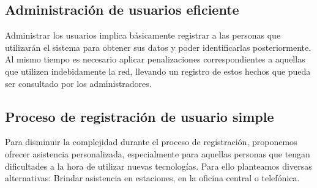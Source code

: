 \subsection{Administración de usuarios eficiente}

Administrar los usuarios implica básicamente registrar a las personas que utilizarán el sistema para obtener sus datos y 
poder identificarlas posteriormente. Al mismo tiempo es necesario aplicar penalizaciones correspondientes a aquellas que 
utilizen indebidamente la red, llevando un registro de estos hechos que pueda ser consultado por los administradores. 

\subsection{Proceso de registración de usuario simple}

Para disminuir la complejidad durante el proceso de registración, proponemos ofrecer asistencia personalizada, especialmente
para aquellas personas que tengan dificultades a la hora de utilizar nuevas tecnologías. Para ello planteamos diversas
alternativas: Brindar asistencia en estaciones, en la oficina central o telefónica.






